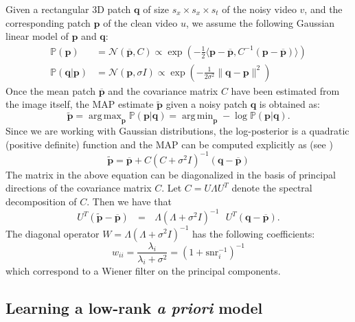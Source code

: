 \documentclass[10pt, a4paper]{article}
\newcommand{\ma}[1]{\boldsymbol{#1}}
\DeclareMathOperator*{\argmin}{arg\,min}
\DeclareMathOperator*{\argmax}{arg\,max}
\begin{document}
Given a rectangular 3D patch $\ma q$ of size $s_x\times s_x\times s_t$ of the noisy video $v$, and the 
corresponding patch $\ma p$ of the clean video $u$, we assume the following 
Gaussian linear model of $\ma p$ and $\ma q$:
\begin{align}
	\mathds{P}(\ma p) &= \mathcal N(\overline {\ma p}, C) \propto \exp\left(-\frac12\langle \ma p - \overline{\ma p}, C^{-1}(\ma p - \overline{\ma p})\rangle\right) \label{eq:prior}\\
	\mathds{P}(\ma q|\ma p) &= \mathcal N(\ma p, \sigma I) \propto \exp\left(-\frac1{2\sigma^2}\|\ma q - \ma p\|^2\right) \label{eq:obs}
\end{align}
Once the mean patch $\overline{\ma p}$ and the
covariance matrix $C$ have been estimated from the image itself, the MAP
estimate $\widetilde{\ma p}$ given a noisy patch $\ma q$ is obtained as:
\[ \widetilde{\ma p} = \argmax_{\ma p} \mathds P(\ma p | \ma q) = \argmin_{\ma p} -\log \mathds P(\ma p | \ma q). \]
Since we are working with Gaussian distributions, the log-posterior is a quadratic (positive definite)
function and the MAP can be computed explicitly as (see  \cite{Lebrun2013a})
\begin{equation}
	\widetilde{\ma p} = \overline{\ma p} + C(C + \sigma^2 I)^{-1}(\ma q - \overline{\ma p})
	\label{eq:map}
\end{equation}
The matrix in the above equation can be diagonalized in the basis of
principal directions of the covariance matrix $C$.
Let $C = U\Lambda U^T$ denote the spectral decomposition of $C$. Then we have that
\[U^T(\widetilde{\ma p} - \overline{\ma p}) \,\,\,\, = \,\,\,\, 
	\Lambda(\Lambda + \sigma^2 I)^{-1}\,\,\,\,
	U^T (\ma q - \overline{\ma p}).\]
The diagonal operator $W = \Lambda(\Lambda + \sigma^2I)^{-1}$
has the following coefficients:
\begin{equation}
w_{ii} = \frac{\lambda_i}{\lambda_i + \sigma^2}
				 = (1 + \text{snr}_i^{-1})^{-1}
				 \label{eq:wiener_coeffs}
\end{equation}
which correspond to a Wiener filter on the principal components.

%

\subsection{Learning a low-rank \textit{a priori} model}
\end{document}
